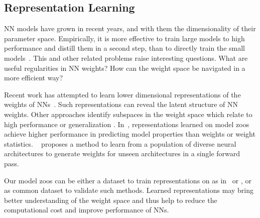 \subsection{Representation Learning}
NN models have grown in recent years, and with them the dimensionality of their parameter space. 
Empirically, it is more effective to train large models to high performance and distill them in a second step, than to directly train the small models~\citep{hoeflerSparsityDeepLearning2021,liuWeActuallyNeed2021}.
This and other related problems raise interesting questions. What are useful regularities in NN weights? How can the weight space be navigated in a more efficient way?

Recent work has attempted to learn lower dimensional representations of the weights of NNs~\citep{haHyperNetworks2016,ratzlaffHyperGANGenerativeModel2019,zhangGraphHyperNetworksNeural2019,knyazevParameterPredictionUnseen2021,schurholtSelfSupervisedRepresentationLearning2021,schurholtHyperRepresentationsGenerativeModels2022,schurholtHyperRepresentationsPreTrainingTransfer2022}. 
Such representations can reveal the latent structure of NN weights.
Other approaches identify subspaces in the weight space which relate to high performance or generalization \citep{wortsmanLearningNeuralNetwork2021,lucasMonotonicLinearInterpolation2021,bentonLossSurfaceSimplexes2021}.
In~\citep{schurholtSelfSupervisedRepresentationLearning2021}, representations learned on model zoos achieve higher performance in predicting model properties than weights or weight statistics. 
~\citep{knyazevParameterPredictionUnseen2021} proposes a method to learn from a population of diverse neural architectures to generate weights for unseen architectures in a single forward pass.

Our model zoos can be either a dataset to train representations on as in~\citep{schurholtSelfSupervisedRepresentationLearning2021} or \citep{bentonLossSurfaceSimplexes2021}, or as common dataset to validate such methods.
Learned representations may bring better understanding of the weight space and thus help to reduce the computational cost and improve performance of NNs.

